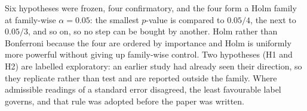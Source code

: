 Six hypotheses were frozen, four confirmatory, and the four form a Holm family at
family-wise $\alpha = 0.05$: the smallest $p$-value is compared to $0.05/4$, the
next to $0.05/3$, and so on, so no step can be bought by another. Holm rather than
Bonferroni because the four are ordered by importance and Holm is uniformly more
powerful without giving up family-wise control. Two hypotheses (H1 and H2) are
labelled exploratory: an earlier study had already seen their direction, so they
replicate rather than test and are reported outside the family. Where admissible
readings of a standard error disagreed, the least favourable label governs, and
that rule was adopted before the paper was written.
